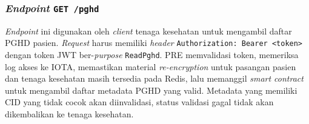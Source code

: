 \subsubsection{\textit{Endpoint} \texttt{GET /pghd}}\label{subsubsec:pre-endpoint-pghd-list}

\textit{Endpoint} ini digunakan oleh \textit{client} tenaga kesehatan untuk mengambil daftar PGHD pasien. 
\textit{Request} harus memiliki \textit{header} \texttt{Authorization: Bearer <token>} dengan token JWT ber-\textit{purpose} \texttt{ReadPghd}. 
PRE memvalidasi token, memeriksa log akses ke IOTA, memastikan material \textit{re-encryption} untuk pasangan pasien dan tenaga kesehatan masih tersedia pada Redis, lalu memanggil \textit{smart contract} untuk mengambil daftar metadata PGHD yang valid. 
Metadata yang memiliki CID yang tidak cocok akan diinvalidasi, status validasi gagal tidak akan dikembalikan ke tenaga kesehatan.

